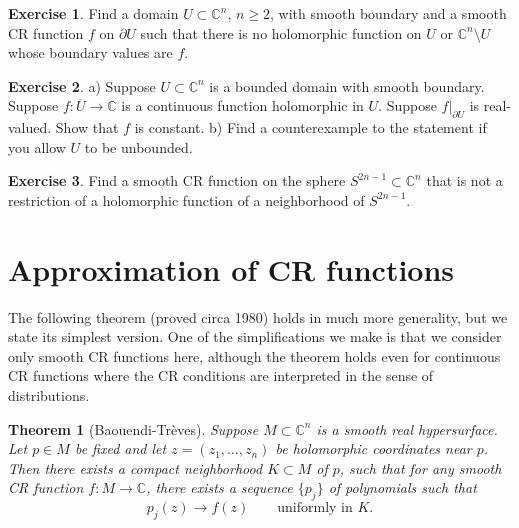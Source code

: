 \documentclass[12pt,openany]{book}
\newcommand{\C}{{\mathbb{C}}}
\theoremstyle{plain}
\newtheorem{thm}{Theorem}[section]
\theoremstyle{remark}
\theoremstyle{definition}
\newenvironment{exbox}{%
    \def\FrameCommand{\vrule width 1pt \relax\hspace {10pt}}%
    \MakeFramed {\advance \hsize -\width \FrameRestore }%
}{%
    \endMakeFramed
}
\theoremstyle{exercise}
\newtheorem{exercise}{Exercise}[section]
\theoremstyle{example}
\begin{document}
\begin{exbox}
\begin{exercise}
Find a domain $U \subset \C^n$, $n \geq 2$, with smooth boundary and a smooth
CR function $f$ on $\partial U$ such that there is no holomorphic function
on $U$ or $\C^n \setminus U$ whose boundary values are $f$.
\end{exercise}

\begin{exercise}
a) Suppose $U \subset \C^n$ is a bounded domain with smooth boundary.  Suppose
$f \colon \overline{U} \to \C$ is a continuous function holomorphic in
$U$.  Suppose $f|_{\partial U}$ is real-valued.  Show that $f$ is
constant. b) Find a counterexample to the statement if you allow $U$
to be unbounded.
\end{exercise}

\begin{exercise}
Find a smooth CR function on the sphere $S^{2n-1} \subset \C^n$ that is not
a restriction of a holomorphic function of a neighborhood of $S^{2n-1}$.
\end{exercise}
\end{exbox}



\section{Approximation of CR functions}

The following theorem (proved circa 1980) holds in much more generality, but
we state its simplest version.  One of the simplifications we make is that
we consider only smooth CR functions here, although the theorem holds even
for continuous CR functions where the CR conditions are interpreted in the
sense of distributions.

\begin{thm}[Baouendi-Tr{\`e}ves]%
Suppose $M \subset \C^n$ is a smooth real hypersurface.
Let $p \in M$ be fixed and let $z=(z_1,\ldots,z_n)$ be holomorphic
coordinates near $p$.
Then there exists a compact
neighborhood $K \subset M$ of $p$, such that for any smooth CR function $f \colon M \to \C$,
there exists a sequence $\{ p_j \}$ of polynomials such that
\begin{equation*}
p_j(z) \to f(z)
\qquad \text{uniformly in $K$.}
\end{equation*}
\end{thm}
\end{document}
